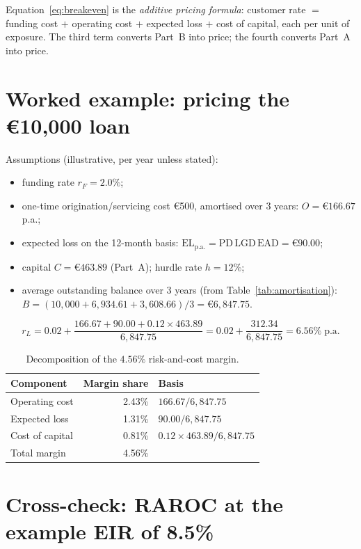 \documentclass[11pt,a4paper]{report}
\renewcommand{\EUR}[1]{\euro#1}
\theoremstyle{definition}
\theoremstyle{plain}
\newcommand{\PD}{\mathrm{PD}}
\newcommand{\LGD}{\mathrm{LGD}}
\newcommand{\EAD}{\mathrm{EAD}}
\newcommand{\EL}{\mathrm{EL}}
\begin{document}
Equation~\eqref{eq:breakeven} is the \emph{additive pricing formula}:
customer rate $=$ funding cost $+$ operating cost $+$ expected loss
$+$ cost of capital, each per unit of exposure. The third term
converts Part~B into price; the fourth converts Part~A into price.

\section{Worked example: pricing the \texorpdfstring{\EUR{10{,}000}}{10000} loan}

Assumptions (illustrative, per year unless stated):
\begin{itemize}
\item funding rate $r_F=2.0\%$;
\item one-time origination/servicing cost \EUR{500}, amortised over
      3 years: $O=\EUR{166.67}$ p.a.;
\item expected loss on the 12-month basis:
      $\EL_{\text{p.a.}}=\PD\,\LGD\,\EAD=\EUR{90.00}$;
\item capital $C=\EUR{463.89}$ (Part~A); hurdle rate $h=12\%$;
\item average outstanding balance over 3 years (from
      Table~\ref{tab:amortisation}):
      $B=(10{,}000+6{,}934.61+3{,}608.66)/3=\EUR{6{,}847.75}$.
\end{itemize}

\begin{equation}
  r_L = 0.02+\frac{166.67+90.00+0.12\times 463.89}{6{,}847.75}
      = 0.02+\frac{312.34}{6{,}847.75}
      = 6.56\% \;\text{p.a.}
\end{equation}

\begin{table}[htbp]
\centering
\caption{Decomposition of the $4.56\%$ risk-and-cost margin.}
\label{tab:decomp}
\begin{tabular}{lrl}
\toprule
Component & Margin share & Basis\\
\midrule
Operating cost & 2.43\% & $166.67/6{,}847.75$\\
Expected loss & 1.31\% & $90.00/6{,}847.75$\\
Cost of capital & 0.81\% & $0.12\times463.89/6{,}847.75$\\
\midrule
Total margin & 4.56\% & \\
\bottomrule
\end{tabular}
\end{table}

\section{Cross-check: RAROC at the example EIR of 8.5\%}
\end{document}
